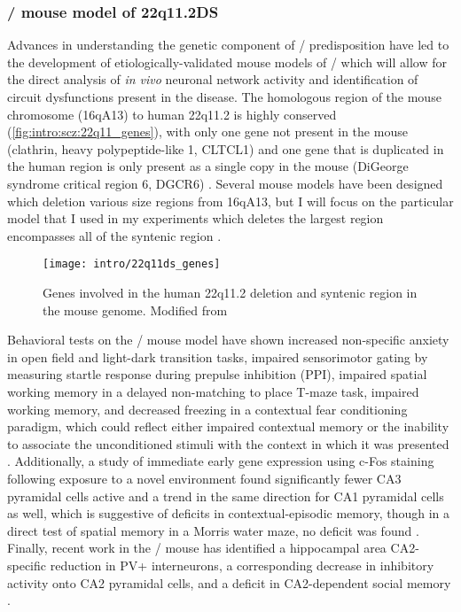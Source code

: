 \subsubsection{\df/ mouse model of 22q11.2DS}
Advances in understanding the genetic component of \scz/ predisposition have led to the development of etiologically-validated mouse models of \scz/ which will allow for the direct analysis of \emph{in vivo} neuronal network activity and identification of circuit dysfunctions present in the disease.
The homologous region of the mouse chromosome (16qA13) to human 22q11.2 is highly conserved (\autoref{fig:intro:scz:22q11_genes}), with only one gene not present in the mouse (clathrin, heavy polypeptide-like 1, CLTCL1) and one gene that is duplicated in the human region is only present as a single copy in the mouse (DiGeorge syndrome critical region 6, DGCR6) \citep{Karayiorgou2010}.
Several mouse models have been designed which deletion various size regions from 16qA13, but I will focus on the particular model that I used in my experiments which deletes the largest region encompasses all of the syntenic region \citep{Stark2008}.

\begin{figure}
	\centering
	\texttt{[image: intro/22q11ds\_genes]}
	\caption[Genetic deletion in 22q11.2DS and \df/]{Genes involved in the human 22q11.2 deletion and syntenic region in the mouse genome. Modified from \citet{Karayiorgou2010}}
	\label{fig:intro:scz:22q11_genes}
\end{figure}

Behavioral tests on the \df/ mouse model have shown increased non-specific anxiety in open field and light-dark transition tasks, impaired sensorimotor gating by measuring startle response during prepulse inhibition (PPI), impaired spatial working memory in a delayed non-matching to place T-maze task, impaired working memory, and decreased freezing in a contextual fear conditioning paradigm, which could reflect either impaired contextual memory or the inability to associate the unconditioned stimuli with the context in which it was presented \citep{Drew2011b, Stark2008, Sigurdsson2010}.
Additionally, a study of immediate early gene expression using c-Fos staining following exposure to a novel environment found significantly fewer CA3 pyramidal cells active and a trend in the same direction for CA1 pyramidal cells as well, which is suggestive of deficits in contextual-episodic memory, though in a direct test of spatial memory in a Morris water maze, no deficit was found \citep{Drew2011b}.
Finally, recent work in the \df/ mouse has identified a hippocampal area CA2-specific reduction in PV+ interneurons, a corresponding decrease in inhibitory activity onto CA2 pyramidal cells, and a deficit in CA2-dependent social memory \citep{Piskorowski2016}.

